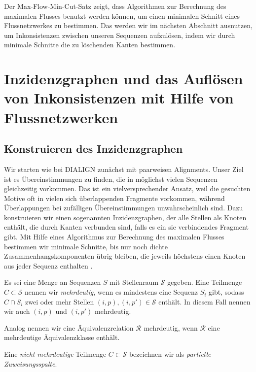 Der Max-Flow-Min-Cut-Satz zeigt, dass Algorithmen zur Berechnung des maximalen Flusses benutzt werden können, um einen minimalen Schnitt eines Flussnetzwerkes zu bestimmen. Das werden wir im nächsten Abschnitt ausnutzen, um Inkonsistenzen zwischen unseren Sequenzen aufzulösen, indem wir durch minimale Schnitte die zu löschenden Kanten bestimmen.

\section{Inzidenzgraphen und das Auflösen von Inkonsistenzen mit Hilfe von Flussnetzwerken}

\subsection{Konstruieren des Inzidenzgraphen}

Wir starten wie bei DIALIGN	zunächst mit paarweisen Alignments. Unser Ziel ist es Übereinstimmungen zu finden, die in möglichst vielen Sequenzen gleichzeitig vorkommen. Das ist ein vielversprechender Ansatz, weil die gesuchten Motive oft in vielen sich überlappenden Fragmente vorkommen, während Überlappungen bei zufälligen Übereinstimmungen unwahrscheinlich sind. Dazu konstruieren wir einen sogenannten Inzidenzgraphen, der alle Stellen als Knoten enthält, die durch Kanten verbunden sind, falls es ein sie verbindendes Fragment gibt. Mit Hilfe eines Algorithmus zur Berechnung des maximalen Flusses bestimmen wir minimale Schnitte, bis nur noch dichte Zusammenhangskomponenten übrig bleiben, die jeweils höchstens einen Knoten aus jeder Sequenz enthalten \cite{cpm10}.

\begin{definition}
	Es sei eine Menge an Sequenzen $S$ mit Stellenraum $\mathcal{S}$ gegeben. Eine Teilmenge $C \subset \mathcal{S}$ nennen wir \emph{mehrdeutig}, wenn es mindestens eine Sequenz $S_i$ gibt, sodass $C \cap S_i$ zwei oder mehr Stellen $(i,p), (i,p') \in \mathcal{S}$ enthält. In diesem Fall nennen wir auch $(i,p)$ und $(i,p')$ mehrdeutig. 
	
	Analog nennen wir eine Äquivalenzrelation $\mathcal{R}$ mehrdeutig, wenn $\mathcal{R}$ eine mehrdeutige Äquivalenzklasse enthält.
	
	Eine \emph{nicht-mehrdeutige} Teilmenge $C \subset \mathcal{S}$ bezeichnen wir als \emph{partielle Zuweisungsspalte}.
\end{definition}

